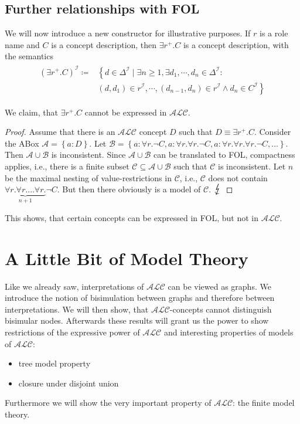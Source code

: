 \section{Further relationships with FOL}
We will now introduce a new constructor for illustrative purposes.
If $r$ is a role name and $C$ is a concept description, then $\exists r^+.C $
is a concept description, with the semantics
\begin{align*}
	\begin{split}
		(\exists r^+.C)^\mathcal{I} \coloneqq &\left\{ d \in \Delta^{\mathcal{I}} \mid \exists n \geq 1, \exists d_1,\cdots, d_n \in \Delta^\mathcal{I} : \right.\\
											  &\left. (d,d_1) \in r^\mathcal{I}, \cdots, (d_{n-1},d_n) \in r^\mathcal{I} \land d_n \in C^\mathcal{I}\right\}
	\end{split}
\end{align*}

We claim, that $\exists r^+.C$ cannot be expressed in $\mathcal{ALC}$.
\begin{proof}
	Assume that there is an $\mathcal{ALC}$ concept $D$ such that $D \equiv \exists r^+.C$.
	Consider the ABox $\mathcal{A} = \left\{ a:D \right\}$.
	Let $ \mathcal{B} = \left\{ a : \forall r.\neg C, a: \forall r.\forall r.\neg C, a:\forall r.\forall r.\forall r.\neg C,\ldots \right\}$.
	Then $\mathcal{A} \cup \mathcal{B}$ is inconsistent.
	Since $\mathcal{A} \cup \mathcal{B}$ can be translated to FOL, compactness applies, i.e.,
	there is a finite subset $\mathcal{C} \subseteq \mathcal{A} \cup \mathcal{B}$ such that $\mathcal{C}$ is inconsistent.
	Let $n$ be the maximal nesting of value-restrictions in $\mathcal{C}$, i.e.,
	$\mathcal{C}$ does not contain $\underbrace{\forall r. \forall r. \ldots \forall r.}_{n+1} \neg C$.
	But then there obviously is a model of $\mathcal{C}$. $\contra$
\end{proof}
This shows, that certain concepts can be expressed in FOL, but not in $\mathcal{ALC}$.

\chapter{A Little Bit of Model Theory}
Like we already saw, interpretations of $\mathcal{ALC}$ can be viewed as graphs.
We introduce the notion of bisimulation between graphs and therefore between interpretations.
We will then show, that $\mathcal{ALC}$-concepts cannot distinguish bisimular nodes.
Afterwards these results will grant us the power to show restrictions of the expressive power of $\mathcal{ALC}$ and
interesting properties of models of $\mathcal{ALC}$:
\begin{itemize}
	\item tree model property
	\item closure under disjoint union
\end{itemize}
Furthermore we will show the very important property of $\mathcal{ALC}$: the finite model theory.

